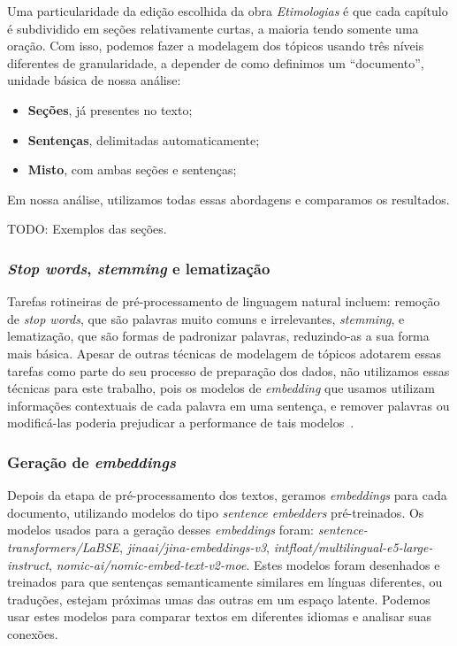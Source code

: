 Uma particularidade da edição escolhida da obra \textit{Etimologias} é que cada capítulo é subdividido em seções relativamente curtas, a maioria tendo somente uma oração. Com isso, podemos fazer a modelagem dos tópicos usando três níveis diferentes de granularidade, a depender de como definimos um ``documento'', unidade básica de nossa análise:
\begin{itemize}
    \item \textbf{Seções}, já presentes no texto;
    \item \textbf{Sentenças}, delimitadas automaticamente;
    \item \textbf{Misto}, com ambas seções e sentenças;
\end{itemize}
Em nossa análise, utilizamos todas essas abordagens e comparamos os resultados.

TODO: Exemplos das seções.

\subsubsection{\textit{Stop words}, \textit{stemming} e lematização}
Tarefas rotineiras de pré-processamento de linguagem natural incluem: remoção de \textit{stop words}, que são palavras muito comuns e irrelevantes, \textit{stemming}, e lematização, que são formas de padronizar palavras, reduzindo-as a sua forma mais básica. Apesar de outras técnicas de modelagem de tópicos adotarem essas tarefas como parte do seu processo de preparação dos dados, não utilizamos essas técnicas para este trabalho, pois os modelos de \textit{embedding} que usamos utilizam informações contextuais de cada palavra em uma sentença, e remover palavras ou modificá-las poderia prejudicar a performance de tais modelos~\citep{stopwords}.

\subsubsection{Geração de \textit{embeddings}}
Depois da etapa de pré-processamento dos textos, geramos \textit{embeddings} para cada documento, utilizando modelos do tipo \textit{sentence embedders} pré-treinados. Os modelos usados para a geração desses \textit{embeddings} foram: \textit{sentence-transformers/LaBSE}, \textit{jinaai/jina-embeddings-v3}, \textit{intfloat/multilingual-e5-large-instruct}, \textit{nomic-ai/nomic-embed-text-v2-moe}. Estes modelos foram desenhados e treinados para que sentenças semanticamente similares em línguas diferentes, ou traduções, estejam próximas umas das outras em um espaço latente. Podemos usar estes modelos para comparar textos em diferentes idiomas e analisar suas conexões.

